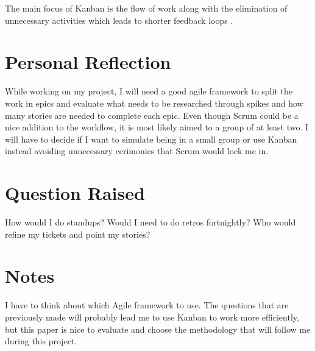 The main focus of Kanban is the flow of work along with the elimination
of unnecessary activities which leads to shorter feedback loops \citep{
zayatFrameworkStudyAgile2020}.

\section{Personal Reflection}
\label{s:Personal-Reflection-4}
While working on my project, I will need a good agile framework to split the work in epics
and evaluate what needs to be researched through spikes and how many stories are needed to complete
each epic. Even though Scrum could be a nice addition to the workflow, it is most likely aimed to a group of
at least two. I will have to decide if I want to simulate being in a small group or use Kanban instead avoiding
unnecessary cerimonies that Scrum would lock me in.

\section{Question Raised}
\label{s:Question-Raised-4}
How would I do standups?
Would I need to do retros fortnightly?
Who would refine my tickets and point my stories?

\section{Notes}
\label{s:Notes-4}
I have to think about which Agile framework to use. The questions that are previously made will
probably lead me to use Kanban to work more efficiently, but this paper is nice to evaluate and choose
the methodology that will follow me during this project.
